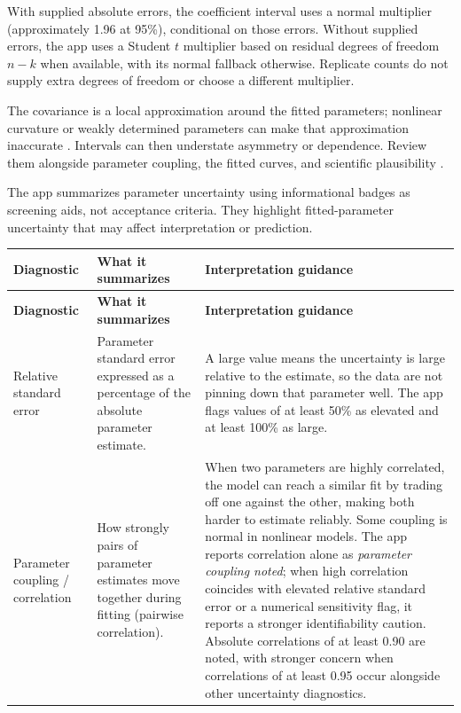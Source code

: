 With supplied absolute errors, the coefficient interval uses a normal multiplier (approximately 1.96 at 95\%), conditional on those errors. Without supplied errors, the app uses a Student $t$ multiplier based on residual degrees of freedom $n-k$ when available, with its normal fallback otherwise. Replicate counts do not supply extra degrees of freedom or choose a different multiplier.

The covariance is a local approximation around the fitted parameters; nonlinear curvature or weakly determined parameters can make that approximation inaccurate \cite{scipyCurveFit}. Intervals can then understate asymmetry or dependence. Review them alongside parameter coupling, the fitted curves, and scientific plausibility \cite{motulsky1987,bates2007}.

The app summarizes parameter uncertainty using informational badges as screening aids, not acceptance criteria. They highlight fitted-parameter uncertainty that may affect interpretation or prediction.

\begin{longtable}{@{}>{\raggedright\arraybackslash}p{}>{\raggedright\arraybackslash}p{}>{\raggedright\arraybackslash}p{}@{}}
\toprule
\textbf{Diagnostic} & \textbf{What it summarizes} & \textbf{Interpretation guidance} \\
\midrule
\endfirsthead
\toprule
\textbf{Diagnostic} & \textbf{What it summarizes} & \textbf{Interpretation guidance} \\
\midrule
\endhead
Relative standard error & Parameter standard error expressed as a percentage of the absolute parameter estimate. & A large value means the uncertainty is large relative to the estimate, so the data are not pinning down that parameter well. The app flags values of at least 50\% as elevated and at least 100\% as large. \\
Parameter coupling / correlation & How strongly pairs of parameter estimates move together during fitting (pairwise correlation). & When two parameters are highly correlated, the model can reach a similar fit by trading off one against the other, making both harder to estimate reliably. Some coupling is normal in nonlinear models. The app reports correlation alone as \emph{parameter coupling noted}; when high correlation coincides with elevated relative standard error or a numerical sensitivity flag, it reports a stronger identifiability caution. Absolute correlations of at least 0.90 are noted, with stronger concern when correlations of at least 0.95 occur alongside other uncertainty diagnostics. \\
\bottomrule
\end{longtable}

